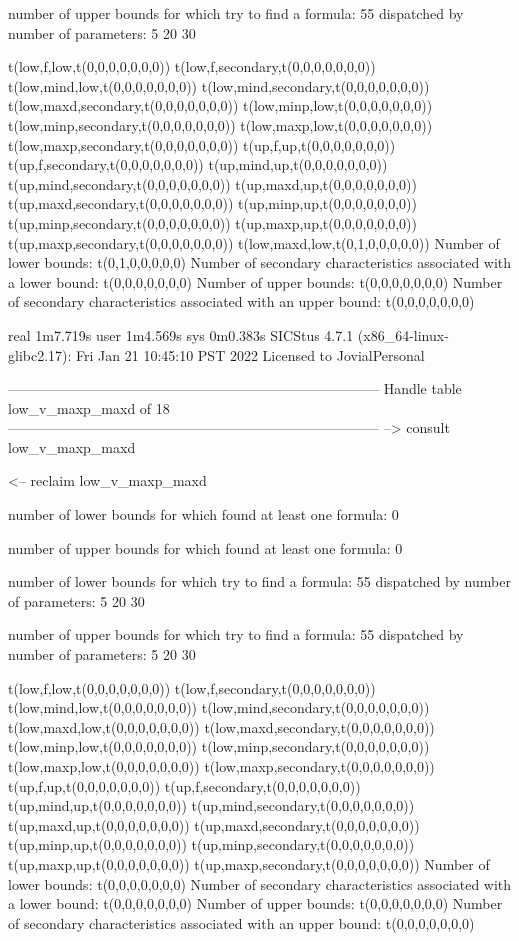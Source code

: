 number of upper bounds for which try to find a formula: 55
dispatched by number of parameters: 5  20  30

t(low,f,low,t(0,0,0,0,0,0,0))
t(low,f,secondary,t(0,0,0,0,0,0,0))
t(low,mind,low,t(0,0,0,0,0,0,0))
t(low,mind,secondary,t(0,0,0,0,0,0,0))
t(low,maxd,secondary,t(0,0,0,0,0,0,0))
t(low,minp,low,t(0,0,0,0,0,0,0))
t(low,minp,secondary,t(0,0,0,0,0,0,0))
t(low,maxp,low,t(0,0,0,0,0,0,0))
t(low,maxp,secondary,t(0,0,0,0,0,0,0))
t(up,f,up,t(0,0,0,0,0,0,0))
t(up,f,secondary,t(0,0,0,0,0,0,0))
t(up,mind,up,t(0,0,0,0,0,0,0))
t(up,mind,secondary,t(0,0,0,0,0,0,0))
t(up,maxd,up,t(0,0,0,0,0,0,0))
t(up,maxd,secondary,t(0,0,0,0,0,0,0))
t(up,minp,up,t(0,0,0,0,0,0,0))
t(up,minp,secondary,t(0,0,0,0,0,0,0))
t(up,maxp,up,t(0,0,0,0,0,0,0))
t(up,maxp,secondary,t(0,0,0,0,0,0,0))
t(low,maxd,low,t(0,1,0,0,0,0,0))
Number of lower bounds:                                             t(0,1,0,0,0,0,0)
Number of secondary characteristics associated with a lower bound:  t(0,0,0,0,0,0,0)
Number of upper bounds:                                             t(0,0,0,0,0,0,0)
Number of secondary characteristics associated with an upper bound: t(0,0,0,0,0,0,0)

real	1m7.719s
user	1m4.569s
sys	0m0.383s
SICStus 4.7.1 (x86_64-linux-glibc2.17): Fri Jan 21 10:45:10 PST 2022
Licensed to JovialPersonal


--------------------------------------------------------------------------------
Handle table low_v_maxp_maxd of 18
--------------------------------------------------------------------------------
--> consult low_v_maxp_maxd

<-- reclaim low_v_maxp_maxd

number of lower bounds for which found at least one formula: 0

number of upper bounds for which found at least one formula: 0

number of lower bounds for which try to find a formula: 55
dispatched by number of parameters: 5  20  30

number of upper bounds for which try to find a formula: 55
dispatched by number of parameters: 5  20  30

t(low,f,low,t(0,0,0,0,0,0,0))
t(low,f,secondary,t(0,0,0,0,0,0,0))
t(low,mind,low,t(0,0,0,0,0,0,0))
t(low,mind,secondary,t(0,0,0,0,0,0,0))
t(low,maxd,low,t(0,0,0,0,0,0,0))
t(low,maxd,secondary,t(0,0,0,0,0,0,0))
t(low,minp,low,t(0,0,0,0,0,0,0))
t(low,minp,secondary,t(0,0,0,0,0,0,0))
t(low,maxp,low,t(0,0,0,0,0,0,0))
t(low,maxp,secondary,t(0,0,0,0,0,0,0))
t(up,f,up,t(0,0,0,0,0,0,0))
t(up,f,secondary,t(0,0,0,0,0,0,0))
t(up,mind,up,t(0,0,0,0,0,0,0))
t(up,mind,secondary,t(0,0,0,0,0,0,0))
t(up,maxd,up,t(0,0,0,0,0,0,0))
t(up,maxd,secondary,t(0,0,0,0,0,0,0))
t(up,minp,up,t(0,0,0,0,0,0,0))
t(up,minp,secondary,t(0,0,0,0,0,0,0))
t(up,maxp,up,t(0,0,0,0,0,0,0))
t(up,maxp,secondary,t(0,0,0,0,0,0,0))
Number of lower bounds:                                             t(0,0,0,0,0,0,0)
Number of secondary characteristics associated with a lower bound:  t(0,0,0,0,0,0,0)
Number of upper bounds:                                             t(0,0,0,0,0,0,0)
Number of secondary characteristics associated with an upper bound: t(0,0,0,0,0,0,0)

